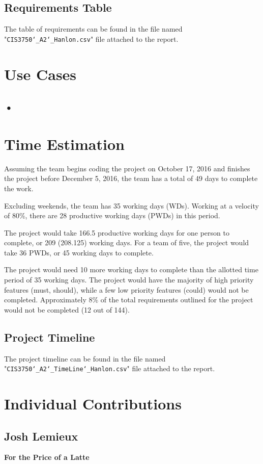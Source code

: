 \documentclass[12pt,letterpaper]{article}
\begin{document}
\subsection{Requirements Table}
The table of requirements can be found in the file named "\texttt{CIS3750\char`_A2\char`_Hanlon.csv}" file attached to the report.

\clearpage
\section{Use Cases}
\subsection{•}

\clearpage
\section{Time Estimation}
Assuming the team begins coding the project on October 17, 2016 and finishes the project before December 5, 2016, the team has a total of 49 days to complete the work. \par
Excluding weekends, the team has 35 working days (WDs). Working at a velocity of 80\%, there are 28 productive working days (PWDs) in this period. \par
The project would take 166.5 productive working days for one person to complete, or 209 (208.125) working days. For a team of five, the project would take 36 PWDs, or 45 working days to complete. \par
The project would need 10 more working days to complete than the allotted time period of 35 working days. The project would have the majority of high priority features (must, should), while a few low priority features (could) would not be completed. Approximately 8\% of the total requirements outlined for the project would not be completed (12 out of 144).

\subsection{Project Timeline}
The project timeline can be found in the file named "\texttt{CIS3750\char`_A2\char`_TimeLine\char`_Hanlon.csv}" file attached to the report.

\clearpage
\section{Individual Contributions}
\subsection{Josh Lemieux}
\textbf{For the Price of a Latte}\par
\end{document}
